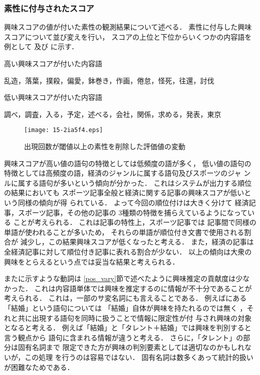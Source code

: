 \documentclass[japanese]{jnlp_1.4}
\newcounter{ex}
\def\ex#1{}
\def\exref#1{}
\begin{document}
\subsubsection{素性に付与されたスコア}\label{scoring}

興味スコアの値が付いた素性の観測結果について述べる．
\pagebreak
素性に付与した興味スコアについて並び変えを行い，
スコアの上位と下位からいくつかの内容語を例として
\exref{score1}及び
\exref{score2}に示す．

\begin{itembox}{\ex{}\label{score1}高い興味スコアが付いた内容語}
\begin{center}
乱造，落葉，撲殺，偏愛，鉢巻き，作画，倦怠，怪死，往還，討伐
\end{center}
\end{itembox}

\begin{itembox}{
\ex{}\label{score2}低い興味スコアが付いた内容語
}
\begin{center}
調べ，調査，入る，予定，述べる，会社，関係，求める，発表，東京
\end{center}
\end{itembox}

\begin{figure}[t]
\begin{center}
\texttt{[image: 15-2ia5f4.eps]}
\end{center}
\caption{出現回数が閾値以上の素性を削除した評価値の変動}
\label{up}
\end{figure}


興味スコアが高い値の語句の特徴としては低頻度の語が多く，
低い値の語句の特徴としては高頻度の語，経済のジャンルに属する語句及びスポーツのジャ
ンルに属する語句が多いという傾向が分かった．
これはシステムが出力する順位の結果においても
スポーツ記事全般と経済に関する記事の興味スコアが低いという同様の傾向が得
られている．
よって今回の順位付けは大きく分けて
経済記事，スポーツ記事，その他の記事の
3種類の特徴を捕らえているようになっている
ことが考えられる．
これは記事の特性上，スポーツ記事では
記事間で同様の単語が使われることが多いため，
それらの単語が順位付き文書で使用される割合が
減少し，この結果興味スコアが低くなったと考える．
また，経済の記事は全経済記事に対して順位付き記事に表れる割合が少ない．
以上の傾向は大衆の興味をとらえるという点では妥当な結果と考えられる．

また\exref{ex_var}に示すような動詞は
\ref{pos_vary}節で述べたように興味推定の貢献度は少なかった．
これは内容語単体では興味を推定するのに情報が不十分であることが考えられる．
これは，一部のサ変名詞にも言えることである．
例えば\exref{ex_var}にある「結婚」という語句については
「結婚」自体が興味を持たれるのでは無く
，それと共に出現する語句を同時に扱うことで情報に限定性が付
与され興味の対象となると考える．
例えば「結婚」と「タレント＋結婚」では興味を判別すると言う観点から
語句に含まれる情報が違うと考える．
さらに，「タレント」の部分は固有名詞まで
限定できた方が興味の判別要素としては適切なのかもしれないが，この処理
を行うのは容易ではない．
固有名詞は数多くあって統計的扱いが困難なためである．
\end{document}

